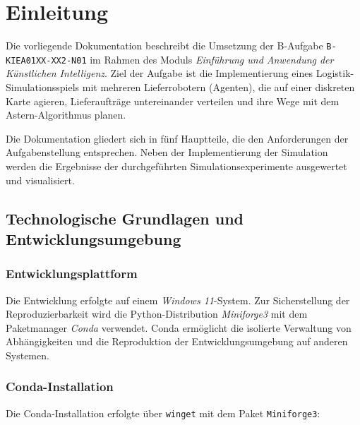 
\chapter{Einleitung}
\label{chap:einleitung}
\thispagestyle{fancy}

Die vorliegende Dokumentation beschreibt die Umsetzung der B-Aufgabe \texttt{B-KIEA01XX-XX2-N01} im Rahmen des Moduls \textit{Einführung und Anwendung der Künstlichen Intelligenz}. Ziel der Aufgabe ist die Implementierung eines Logistik-Simulationsspiels mit mehreren Lieferrobotern (Agenten), die auf einer diskreten Karte agieren, Lieferaufträge untereinander verteilen und ihre Wege mit dem \acs{Astern}-Algorithmus planen.

Die Dokumentation gliedert sich in fünf Hauptteile, die den Anforderungen der Aufgabenstellung entsprechen. Neben der Implementierung der Simulation werden die Ergebnisse der durchgeführten Simulationsexperimente ausgewertet und visualisiert.

\section{Technologische Grundlagen und Entwicklungsumgebung}

\subsection{Entwicklungsplattform}

Die Entwicklung erfolgte auf einem \textit{Windows 11}-System. Zur Sicherstellung der Reproduzierbarkeit wird die Python-Distribution \textit{Miniforge3} mit dem Paketmanager \textit{Conda} verwendet. Conda ermöglicht die isolierte Verwaltung von Abhängigkeiten und die Reproduktion der Entwicklungsumgebung auf anderen Systemen.

\subsection{Conda-Installation}

Die Conda-Installation erfolgte über \texttt{winget} mit dem Paket \texttt{Miniforge3}:



